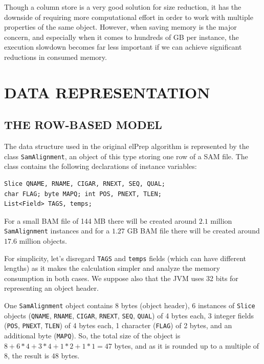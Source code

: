 \documentclass[a4paper,twoside]{article}
\begin{document}
Though a column store is a very good solution for size reduction, it has the downside of requiring more computational effort in order to work with multiple properties of the same object.
However, when saving memory is the major concern, and especially when it comes to hundreds of GB per instance, the execution slowdown becomes far less important if we can achieve significant reductions in consumed memory.





\section{\uppercase{Data Representation}}
\label{sec:model}

\subsection{\uppercase{The Row-Based Model}}
\label{subsec:row}

The data structure used in the original elPrep algorithm is represented by the class \texttt{SamAlignment}, an object of this type storing one row of a SAM file.
The class contains the following declarations of instance variables:

\begin{small}
\begin{verbatim}
Slice QNAME, RNAME, CIGAR, RNEXT, SEQ, QUAL; 
char FLAG; byte MAPQ; int POS, PNEXT, TLEN;
List<Field> TAGS, temps;
\end{verbatim}
\end{small}
For a small BAM file of 144 MB there will be created around $2.1$ million \texttt{SamAlignment} instances and for a $1.27$ GB BAM file there will be created around $17.6$ million objects.

For simplicity, let's disregard \texttt{TAGS} and \texttt{temps} fields (which can have different lengths) as it makes the calculation simpler and analyze the memory consumption in both cases.
We suppose also that the JVM uses 32 bits for representing an object header.

One {\texttt{SamAlignment}} object contains
8 bytes (object header), 6 instances of \texttt{Slice} objects (\texttt{QNAME}, \texttt{RNAME}, \texttt{CIGAR}, \texttt{RNEXT}, \texttt{SEQ}, \texttt{QUAL}) of 4 bytes each, 3 integer fields ({\texttt{POS}}, {\texttt{PNEXT}}, {\texttt{TLEN}}) of 4 bytes each, 1 character ({\texttt{FLAG}}) of 2 bytes, and an additional byte ({\texttt{MAPQ}}).
So, the total size of the object is $8 + 6 * 4 + 3*4  + 1 * 2+ 1 * 1 = 47$ bytes, and as it is rounded up to a multiple of $8$, the result is $48$ bytes.
\end{document}
